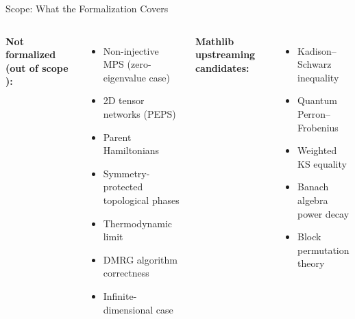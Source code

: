 \documentclass[aspectratio=169,10pt]{beamer}
\begin{document}
\begin{frame}{Scope: What the Formalization Covers}
\begin{columns}[T]
        \textbf{\textcolor{dimwhite}{Not formalized (out of scope \cite{Cirac2021Matrix}):}}
        \begin{itemize}\itemsep0.08em\scriptsize
            \item[\textcolor{dimwhite}{$\diamond$}] Non-injective MPS (zero-eigenvalue case)
            \item[\textcolor{dimwhite}{$\diamond$}] 2D tensor networks (PEPS)
            \item[\textcolor{dimwhite}{$\diamond$}] Parent Hamiltonians
            \item[\textcolor{dimwhite}{$\diamond$}] Symmetry-protected topological phases
            \item[\textcolor{dimwhite}{$\diamond$}] Thermodynamic limit
            \item[\textcolor{dimwhite}{$\diamond$}] DMRG algorithm correctness
            \item[\textcolor{dimwhite}{$\diamond$}] Infinite-dimensional case
        \end{itemize}

        \vspace{0.3em}
        \textbf{\textcolor{leangreen}{Mathlib upstreaming candidates:}}
        \begin{itemize}\itemsep0.05em\scriptsize
            \item[\textcolor{leangreen}{\checkmark}] Kadison--Schwarz inequality
            \item[\textcolor{leangreen}{\checkmark}] Quantum Perron--Frobenius
            \item[\textcolor{leangreen}{\checkmark}] Weighted KS equality
            \item[\textcolor{leangreen}{\checkmark}] Banach algebra power decay
            \item[\textcolor{leangreen}{\checkmark}] Block permutation theory
        \end{itemize}
    \end{columns}
\end{frame}


\end{document}
